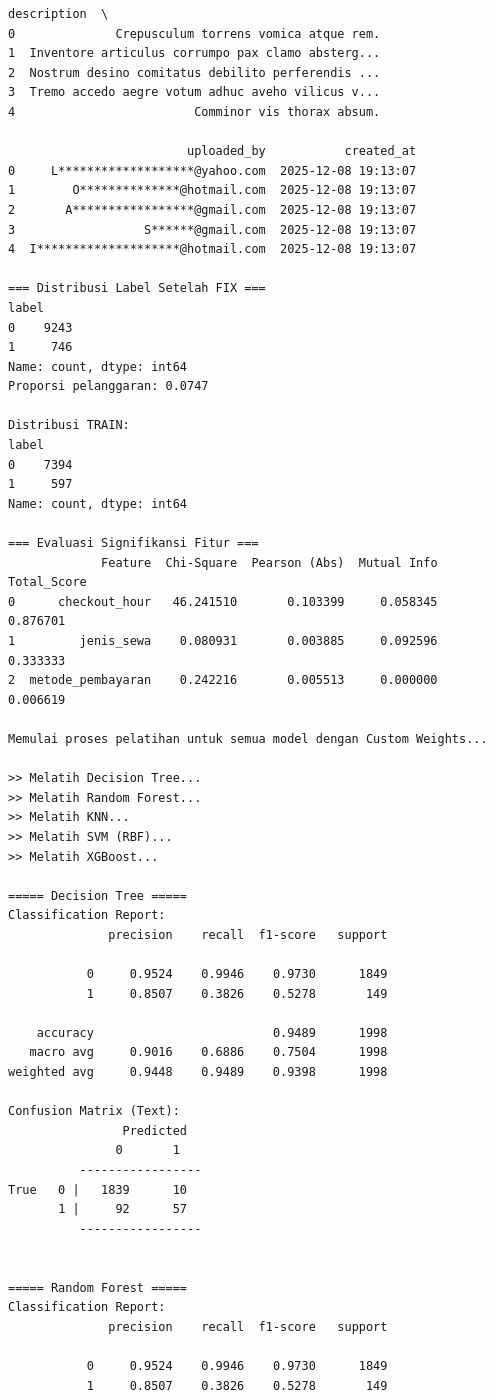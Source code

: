 \begin{lstlisting}[caption={Output 8}]
                                         description  \
0              Crepusculum torrens vomica atque rem.   
1  Inventore articulus corrumpo pax clamo absterg...   
2  Nostrum desino comitatus debilito perferendis ...   
3  Tremo accedo aegre votum adhuc aveho vilicus v...   
4                         Comminor vis thorax absum.   

                         uploaded_by           created_at  
0     L*******************@yahoo.com  2025-12-08 19:13:07  
1        O**************@hotmail.com  2025-12-08 19:13:07  
2       A*****************@gmail.com  2025-12-08 19:13:07  
3                  S******@gmail.com  2025-12-08 19:13:07  
4  I********************@hotmail.com  2025-12-08 19:13:07  

=== Distribusi Label Setelah FIX ===
label
0    9243
1     746
Name: count, dtype: int64
Proporsi pelanggaran: 0.0747

Distribusi TRAIN:
label
0    7394
1     597
Name: count, dtype: int64

=== Evaluasi Signifikansi Fitur ===
             Feature  Chi-Square  Pearson (Abs)  Mutual Info  Total_Score
0      checkout_hour   46.241510       0.103399     0.058345     0.876701
1         jenis_sewa    0.080931       0.003885     0.092596     0.333333
2  metode_pembayaran    0.242216       0.005513     0.000000     0.006619

Memulai proses pelatihan untuk semua model dengan Custom Weights...

>> Melatih Decision Tree...
>> Melatih Random Forest...
>> Melatih KNN...
>> Melatih SVM (RBF)...
>> Melatih XGBoost...

===== Decision Tree =====
Classification Report:
              precision    recall  f1-score   support

           0     0.9524    0.9946    0.9730      1849
           1     0.8507    0.3826    0.5278       149

    accuracy                         0.9489      1998
   macro avg     0.9016    0.6886    0.7504      1998
weighted avg     0.9448    0.9489    0.9398      1998

Confusion Matrix (Text):
                Predicted
               0       1
          -----------------
True   0 |   1839      10
       1 |     92      57
          -----------------


===== Random Forest =====
Classification Report:
              precision    recall  f1-score   support

           0     0.9524    0.9946    0.9730      1849
           1     0.8507    0.3826    0.5278       149


\end{lstlisting}
